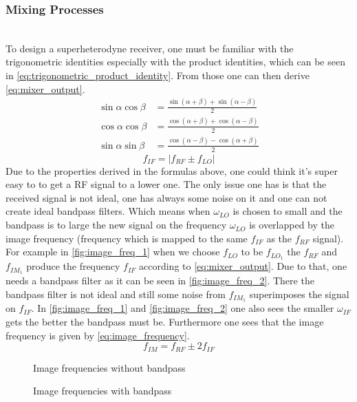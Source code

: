 \subsubsection{Mixing Processes}\mbox{}\\
To design a superheterodyne receiver, one must be familiar with the trigonometric identities especially with the product identities, which can be seen in \autoref{eq:trigonometric_product_identity}. From those one can then derive \autoref{eq:mixer_output}.
\begin{equation}\label{eq:trigonometric_product_identity}
\begin{aligned}
\sin \alpha \cos \beta &=\frac{\sin (\alpha+\beta)+\sin (\alpha-\beta)}{2} \\
\cos \alpha \cos \beta &=\frac{\cos (\alpha+\beta)+\cos (\alpha-\beta)}{2} \\
\sin \alpha \sin \beta &=\frac{\cos (\alpha-\beta)-\cos (\alpha+\beta)}{2}
\end{aligned}
\end{equation}
\begin{equation}\label{eq:mixer_output}
f_{I F}=\left|f_{R F} \pm f_{L O}\right|
\end{equation}
Due to the properties derived in the formulas above, one could think it's super easy to to get a RF signal to a lower one. The only issue one has is that the received signal is not ideal, one has always some noise on it and one can not create ideal bandpass filters. Which means when $\omega_{LO}$ is chosen to small and the bandpass is to large the new signal on the frequency $\omega_{LO}$ is overlapped by the image frequency (frequency which is mapped to the same $f_{IF}$ as the $f_{RF}$ signal). \newline For example in \autoref{fig:image_freq_1} when we choose $f_{LO}$ to be $f_{LO_1}$ the $f_{RF}$ and $f_{IM_1}$ produce the frequency $f_{IF}$ according to \autoref{eq:mixer_output}. Due to that, one needs a bandpass filter as it can be seen in \autoref{fig:image_freq_2}. There the bandpass filter is not ideal and still some noise from $f_{IM_1}$ superimposes the signal on $f_{IF}$. In \autoref{fig:image_freq_1} and \autoref{fig:image_freq_2} one also sees the smaller $\omega_{IF}$ gets the better the bandpass must be. Furthermore one sees that the image frequency is given by \autoref{eq:image_frequency}.
\begin{equation}\label{eq:image_frequency}
f_{I M}=f_{R F} \pm 2 f_{I F}
\end{equation}
\begin{figure}[ht]
  \centering
  \caption{Image frequencies without bandpass}
  \label{fig:image_freq_1}
\end{figure}
\begin{figure}[ht]
  \centering
  \caption{Image frequencies with bandpass}
  \label{fig:image_freq_2}
\end{figure}


